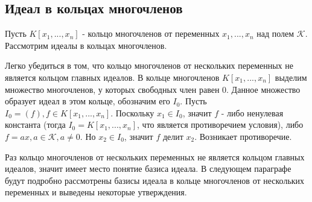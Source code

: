  \subsection{Идеал в кольцах многочленов}
 
 Пусть $K \left[ x_{1}, ... , x_{n} \right]$ - кольцо многочленов от переменных $x_{1}, ... ,x_{n}$ над полем $\mathcal{K}$.
 Рассмотрим идеалы в кольцах многочленов.
 
 Легко убедиться в том, что кольцо многочленов от нескольких переменных не является кольцом главных идеалов.
В кольце многочленов $K \left[ x_{1}, ... , x_{n} \right]$ выделим множество многочленов, у которых свободных член равен $0$. Данное множество образует идеал в этом кольце, обозначим его $I_{0}$. Пусть $ I_{0}  = (f), f \in K \left[ x_{1}, ... , x_{n} \right] $. Поскольку $x_{1} \in I_{0}$, значит $f$ - либо ненулевая константа (тогда $I_{0} =K \left[ x_{1}, ... , x_{n} \right] $, что является противоречием условия), либо $f = ax, a \in \mathcal{K}, a \neq 0$. Но $x_{2} \in I_{0}$, значит $f$ делит 
 $x_{2}$. Возникает противоречие.
 
Раз кольцо многочленов от нескольких переменных не является кольцом главных идеалов, значит имеет место понятие базиса идеала. В следующем параграфе будут подробно рассмотрены базисы идеала в кольце многочленов от нескольких переменных и выведены некоторые утверждения.







 
 
 


